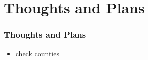 \documentclass{beamer}
\begin{document}
\section{Thoughts and Plans} %
\begin{frame}
\frametitle{Thoughts and Plans}
\begin{itemize}[label={-}]

\item check counties

\end{itemize}
\end{frame}
\end{document}
